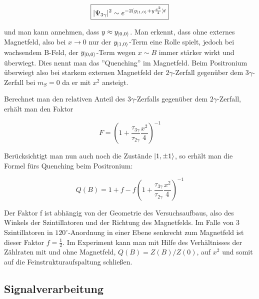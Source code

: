 \begin{equation} \boxed{ |\Psi_{3\gamma}|^2 \sim e^{-2(y_{\ket{1,0}}+y\frac{x^2}{4})t} } \end{equation}

und man kann annehmen, dass $y \approx y_{\ket{0,0}}$. Man erkennt, dass ohne externes Magnetfeld, also bei $x\to 0$ nur der $y_{\ket{1,0}}$-Term eine Rolle spielt, jedoch bei wachsendem B-Feld, der $y_{\ket{0,0}}$-Term wegen $x \sim B$ immer stärker wirkt und überwiegt. Dies nennt man das ''Quenching'' im Magnetfeld. Beim Positronium überwiegt also bei starkem externen Magnetfeld der $2\gamma$-Zerfall gegenüber dem $3\gamma$-Zerfall bei $m_S = 0$ da er mit $x^2$ ansteigt.

Berechnet man den relativen Anteil des $3\gamma$-Zerfalls gegenüber dem $2\gamma$-Zerfall, erhält man den Faktor

$$ F = \left( 1+\frac{\tau_{3\gamma}}{\tau_{2\gamma}}\frac{x^2}{4}\right)^{-1} $$

Berücksichtigt man nun auch noch die Zustände $\ket{1,\pm1}$, so erhält man die Formel fürs Quenching beim Positronium:

\begin{equation} \boxed{Q(B) = 1 + f - f\left( 1+\frac{\tau_{3\gamma}}{\tau_{2\gamma}}\frac{x^2}{4}\right)^{-1}} \end{equation}

Der Faktor f ist abhängig von der Geometrie des Versuchsaufbaus, also des Winkels der Szintillatoren und der Richtung des Magnetfelds. Im Falle von 3 Szintillatoren in $120^\circ$-Anordnung in einer Ebene senkrecht zum Magnetfeld ist dieser Faktor $f=\frac{1}{2}$. Im Experiment kann man mit Hilfe des Verhältnisses der Zählraten mit und ohne Magnetfeld, $Q(B) = Z(B) / Z(0)$,  auf $x^2$ und somit auf die Feinstrukturaufspaltung schließen.

\subsection{Signalverarbeitung}























